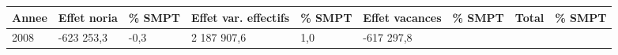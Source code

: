 \begin{longtable}[]{@{}lllllllll@{}}
\toprule
\begin{minipage}[b]{0.05\columnwidth}\raggedright
Annee\strut
\end{minipage} & \begin{minipage}[b]{0.10\columnwidth}\raggedright
Effet noria\strut
\end{minipage} & \begin{minipage}[b]{0.06\columnwidth}\raggedright
\% SMPT\strut
\end{minipage} & \begin{minipage}[b]{0.16\columnwidth}\raggedright
Effet var. effectifs\strut
\end{minipage} & \begin{minipage}[b]{0.06\columnwidth}\raggedright
\% SMPT\strut
\end{minipage} & \begin{minipage}[b]{0.12\columnwidth}\raggedright
Effet vacances\strut
\end{minipage} & \begin{minipage}[b]{0.06\columnwidth}\raggedright
\% SMPT\strut
\end{minipage} & \begin{minipage}[b]{0.10\columnwidth}\raggedright
Total\strut
\end{minipage} & \begin{minipage}[b]{0.06\columnwidth}\raggedright
\% SMPT\strut
\end{minipage}\tabularnewline
\midrule
\endhead
\begin{minipage}[t]{0.05\columnwidth}\raggedright
2008\strut
\end{minipage} & \begin{minipage}[t]{0.10\columnwidth}\raggedright
-623 253,3\strut
\end{minipage} & \begin{minipage}[t]{0.06\columnwidth}\raggedright
-0,3\strut
\end{minipage} & \begin{minipage}[t]{0.16\columnwidth}\raggedright
2 187 907,6\strut
\end{minipage} & \begin{minipage}[t]{0.06\columnwidth}\raggedright
1,0\strut
\end{minipage} & \begin{minipage}[t]{0.12\columnwidth}\raggedright
-617 297,8\strut
\end{minipage} & \begin{minipage}[t]{0.06\columnwidth}\raggedright

\end{minipage}
\end{longtable}
